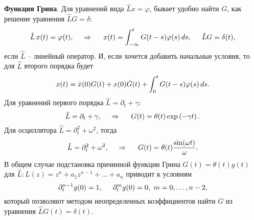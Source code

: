 




\textbf{Функция Грина}. Для уравнений вида $\hat{L} x = \varphi$, бывает удобно найти $G$, как решение уравнения $\hat{L} G = \delta$:
\begin{equation}
    \hat{L}\, x(t) = \varphi(t), 
    \hspace{0.5cm} \Rightarrow \hspace{0.5cm}
    x(t) = \int_{-\infty}^{t} G(t-s) \varphi(s) \, d s,
    \hspace{5 mm} 
    \hat{L} G = \delta(t),
\end{equation}
если $\hat{L}$ -- линейный оператор. 
И, если хочется добавить начальные условия, то для $\hat{L}$ второго порядка будет
\begin{equation*}
    x(t) = \dot{x}(0) G(t) + x(0) \dot{G}(t) + \int_{0}^{t} G(t-s) \varphi(s) \, d s.
\end{equation*}
Для уравнений первого порядка $\hat{L} = \partial_t + \gamma$:
\begin{equation*}
    \hat{L} = \partial_t + \gamma,
    \hspace{0.5cm} \Rightarrow \hspace{0.5cm}
    G(t) = \theta(t) \exp\left(- \gamma t\right).
\end{equation*}
Для осциллятора $\hat{L} = \partial_t^2 + \omega^2$, тогда
\begin{equation*}
    \hat{L} = \partial_t^2 + \omega^2,
    \hspace{0.5cm} \Rightarrow \hspace{0.5cm}
    G(t) = \theta(t) \frac{\sin(\omega t)}{\omega}.
\end{equation*}
В общем случае подстановка причинной функции Грина $G(t) = \theta(t) g(t)$ для $\hat{L} \colon  L(z) = z^n + a_1 z^{n-1} + \ldots + a_n$ приводит к условиям 
\begin{equation*}
    \partial_t^{n-1} g(0) = 1,
    \hspace{5 mm} 
    \partial_t^m g(0) = 0, \  m = 0,\ldots,n-2,
\end{equation*}
который позволяют методом неопределенных коэффициентов найти $G$ из уравнения $\hat{L} G(t) = \delta(t)$. 



